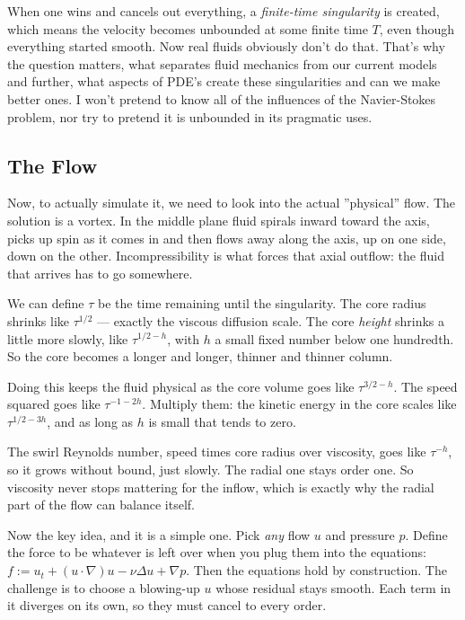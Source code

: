 When one wins and cancels out everything, a \emph{finite-time singularity} is created, which means the velocity becomes unbounded at some finite time $T$, even though everything started smooth. Now real fluids obviously don't do that. That's why the question matters, what separates fluid mechanics from our current models and further, what aspects of PDE's create these singularities and can we make better ones. I won't pretend to know all of the influences of the Navier-Stokes problem, nor try to pretend it is unbounded in its pragmatic uses.

\subsection{The Flow}

Now, to actually simulate it, we need to look into the actual ''physical'' flow. The solution is a vortex. In the middle plane fluid spirals inward toward the axis, picks up spin as it comes in and then flows away along the axis, up on one side, down on the other. Incompressibility is what forces that axial outflow: the fluid that arrives has to go somewhere.

We can define $\tau$ be the time remaining until the singularity. The core radius shrinks like $\tau^{1/2}$ --- exactly the viscous diffusion scale. The core \emph{height} shrinks a little more slowly, like $\tau^{1/2-h}$, with $h$ a small fixed number below one hundredth. So the core becomes a longer and longer, thinner and thinner column.

Doing this keeps the fluid physical as the core volume goes like $\tau^{3/2-h}$. The speed squared goes like $\tau^{-1-2h}$. Multiply them: the kinetic energy in the core scales like $\tau^{1/2-3h}$, and as long as $h$ is small that tends to zero.

The swirl Reynolds number, speed times core radius over viscosity, goes like $\tau^{-h}$, so it grows without bound, just slowly. The radial one stays order one. So viscosity never stops mattering for the inflow, which is exactly why the radial part of the flow can balance itself.

Now the key idea, and it is a simple one. Pick \emph{any} flow $u$ and pressure $p$. Define the force to be whatever is left over when you plug them into the equations: $f := u_t + (u\cdot\nabla)u - \nu\Delta u + \nabla p$. Then the equations hold by construction. The challenge is to choose a blowing-up $u$ whose residual stays smooth. Each term in it diverges on its own, so they must cancel to every order.

